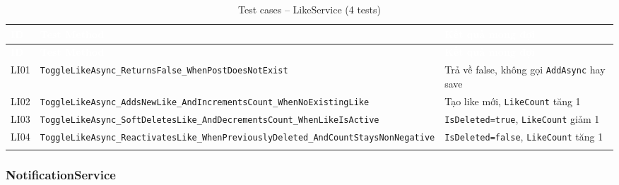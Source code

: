 \documentclass[a4paper]{article}
\begin{document}
\begin{longtable}{|C{0.8cm}|L{5.4cm}|L{7.4cm}|}
\hline
{}
\textcolor{white}{\textbf{ID}} &
\textcolor{white}{\textbf{Test Method}} &
\textcolor{white}{\textbf{Kết quả mong đợi}} \\
\hline
\endfirsthead
\hline
{}
\textcolor{white}{\textbf{ID}} &
\textcolor{white}{\textbf{Test Method}} &
\textcolor{white}{\textbf{Kết quả mong đợi}} \\
\hline
\endhead
\hline
\endfoot

LI01 & \texttt{ToggleLikeAsync\_ReturnsFalse\_WhenPostDoesNotExist} & Trả về false, không gọi \texttt{AddAsync} hay save \\
\hline
LI02 & \texttt{ToggleLikeAsync\_AddsNewLike\_AndIncrementsCount\_WhenNoExistingLike} & Tạo like mới, \texttt{LikeCount} tăng 1 \\
\hline
{}
LI03 & \texttt{ToggleLikeAsync\_SoftDeletesLike\_AndDecrementsCount\_WhenLikeIsActive} & \texttt{IsDeleted=true}, \texttt{LikeCount} giảm 1 \\
\hline
LI04 & \texttt{ToggleLikeAsync\_ReactivatesLike\_WhenPreviouslyDeleted\_AndCountStaysNonNegative} & \texttt{IsDeleted=false}, \texttt{LikeCount} tăng 1 \\
\hline
\caption{Test cases -- LikeService (4 tests)}
\end{longtable}

\subsubsection{NotificationService}
\end{document}
